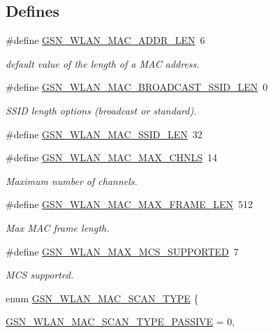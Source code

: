 \subsection*{Defines}
\begin{DoxyCompactItemize}
\item 
\#define \hyperlink{a00641_gab875910eb7b2ccc2d9d632ad20f6564c}{GSN\_\-WLAN\_\-MAC\_\-ADDR\_\-LEN}~6
\begin{DoxyCompactList}\small\item\em default value of the length of a MAC address. \end{DoxyCompactList}\end{DoxyCompactItemize}
\begin{DoxyCompactItemize}
\item 
\#define \hyperlink{a00641_gabe983e40f4fad264d1750aa6c4bcfcac}{GSN\_\-WLAN\_\-MAC\_\-BROADCAST\_\-SSID\_\-LEN}~0
\begin{DoxyCompactList}\small\item\em SSID length options (broadcast or standard). \end{DoxyCompactList}\item 
\#define \hyperlink{a00641_ga93c24ba92c21c82b929e23b532ec4002}{GSN\_\-WLAN\_\-MAC\_\-SSID\_\-LEN}~32
\item 
\#define \hyperlink{a00641_ga81f65ed973227d85ed9048e0047663da}{GSN\_\-WLAN\_\-MAC\_\-MAX\_\-CHNLS}~14
\begin{DoxyCompactList}\small\item\em Maximum number of channels. \end{DoxyCompactList}\item 
\#define \hyperlink{a00641_gae731ba25818bdbc75a996de819a860e6}{GSN\_\-WLAN\_\-MAC\_\-MAX\_\-FRAME\_\-LEN}~512
\begin{DoxyCompactList}\small\item\em Max MAC frame length. \end{DoxyCompactList}\item 
\#define \hyperlink{a00641_ga8c7cea28939d8ce06e159841483e73c9}{GSN\_\-WLAN\_\-MAX\_\-MCS\_\-SUPPORTED}~7
\begin{DoxyCompactList}\small\item\em MCS supported. \end{DoxyCompactList}\item 
enum \hyperlink{a00641_ga52dec04a012aa9893ac84e96062c470b}{GSN\_\-WLAN\_\-MAC\_\-SCAN\_\-TYPE} \{ \par
\hyperlink{a00641_gga52dec04a012aa9893ac84e96062c470bae09f79c4995407cd667ad1b5abcc9612}{GSN\_\-WLAN\_\-MAC\_\-SCAN\_\-TYPE\_\-PASSIVE} =  0, 

\end{DoxyCompactItemize}
